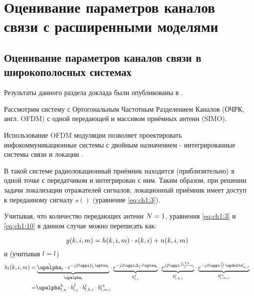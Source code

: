 \chapter{Оценивание параметров каналов связи с расширенными моделями}\label{ch:ch2}

\section{Оценивание параметров каналов связи в широкополосных системах}\label{ch:ch2/sec1}

Результаты данного раздела доклада были опубликованы в \cite{Zhang2017, Podkurkov2019}.

Рассмотрим систему с Ортогональным Частотным Разделением Каналов (ОЧРК, англ. OFDM) с одной передающей и массивом приёмных антенн (SIMO).

Использование OFDM модуляции позволяет проектировать инфокоммуникационные системы с двойным назначением - интегрированные системы связи и локации \cite{Sturm09, Sturm10, Sturm11, Braun14}.

В такой системе радиолокационный приёмник находится (приблизительно) в одной точке с передатчиком и интегрирован с ним. Таким образом, при решении задачи локализации отражателей сигналов, локационный приёмник имеет доступ к переданному сигналу $s()$ (уравнение \eqref{eq:ch1:3}).

Учитывая, что количество передающих антенн ${N}=1$, уравнения \eqref{eq:ch1:3} и \eqref{eq:ch1:10} в данном случае можно переписать как:

\let\gpai\pai
\let\ggaini\gaini
\let\gdelay\delay
\renewcommand{\pai}{{l}}
\renewcommand{\gaini}{\gain_\pai}
\renewcommand{\delay}{\tau_\pai}
\renewcommand{\vrel}{v_\pai}
\newcommand{\sx}{\Delta_x}
\newcommand{\sy}{\Delta_y}
\newcommand{\rxxi}{\rxi_x}
\newcommand{\rxyi}{\rxi_y}
\newcommand{\dcx}{\nu_\pai^x}
\newcommand{\dcy}{\nu_\pai^y}

\begin{equation}
\label{eq:ch2/sec1:3}
y(k,i,{m}) = h(k,i,{m}) \cdot s(k,i) + n(k,i,{m})
\end{equation}
и (учитывая $\gpai=\pai$)
\begin{equation}
\begin{aligned}
\label{eq:ch1/sec1:10}
\hpa(\ti,\fri,\rxi) =&\underbrace{\tgaini \cdot e^{-j2\pi \lfr \delay}}_{\gaini} \cdot 
\underbrace{e^{-j2\pi \scs \fri \delay}}_{b_{\pai,\fri}^f} \cdot
\underbrace{e^{j2\pi \frac{\sfr \ts\ti}{c} \vrel}}_{b_{\pai,\ti,\fri}^t} \cdot
\underbrace{e^{-j2\pi \frac{\sfr}{c} \delrx}}_{b_{\pai,\rxi,\fri}^\te{rx}} \\
=&\gain_{\pai,\txi}^\ti \cdot b_{\pai,\fri}^f \cdot b_{\pai,\ti,\fri}^t  \cdot b_{\pai,\rxi,\fri}^\te{rx}
\end{aligned}
\end{equation}

